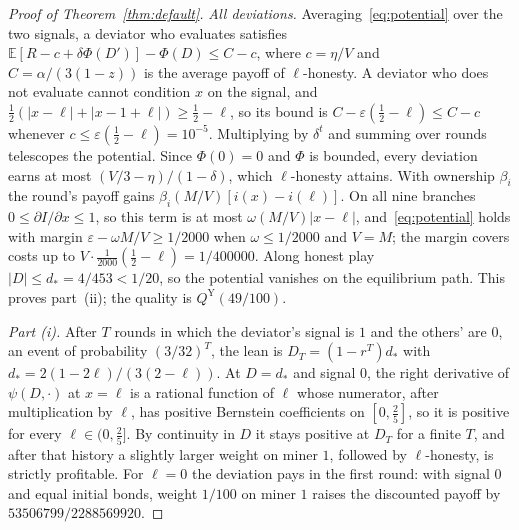\documentclass[sigconf,anonymous,review]{acmart}
\numberwithin{equation}{section}
\newcommand{\E}{\mathbb{E}}
\newcommand{\QY}{Q^{\mathrm{Y}}}
\begin{document}
\begin{proof}[Proof of Theorem~\ref{thm:default}]
\emph{All deviations.} Averaging~\eqref{eq:potential} over the two signals, a
deviator who evaluates satisfies $\E[R-c+\delta\Phi(D')]-\Phi(D)\le C-c$, where
$c=\eta/V$ and $C=\alpha/(3(1-z))$ is the average payoff of $\ell$-honesty. A
deviator who does not evaluate cannot condition $x$ on the signal, and
$\frac12(|x-\ell|+|x-1+\ell|)\ge\frac12-\ell$, so its bound is
$C-\varepsilon(\frac12-\ell)\le C-c$ whenever $c\le\varepsilon(\frac12-\ell)=10^{-5}$.
Multiplying by $\delta^t$ and summing over rounds telescopes the potential.
Since $\Phi(0)=0$ and $\Phi$ is bounded, every deviation earns at most
$(V/3-\eta)/(1-\delta)$, which $\ell$-honesty attains. With ownership
$\beta_i$ the round's payoff gains $\beta_i(M/V)[i(x)-i(\ell)]$. On all nine
branches $0\le\partial I/\partial x\le1$, so this term is at most
$\omega(M/V)|x-\ell|$, and~\eqref{eq:potential} holds with margin
$\varepsilon-\omega M/V\ge1/2000$ when $\omega\le1/2000$ and $V=M$; the margin
covers costs up to $V\cdot\frac1{2000}(\frac12-\ell)=1/400000$. Along honest play
$|D|\le d_*=4/453<1/20$, so the potential vanishes on the equilibrium path. This
proves part~(ii); the quality is $\QY(49/100)$.

\emph{Part (i).} After $T$ rounds in which the deviator's signal is $1$ and the
others' are $0$, an event of probability $(3/32)^T$, the lean is
$D_T=(1-r^T)d_*$ with $d_*=2(1-2\ell)/(3(2-\ell))$. At $D=d_*$ and signal $0$,
the right derivative of $\psi(D,\cdot)$ at $x=\ell$ is a rational function of
$\ell$ whose numerator, after multiplication by $\ell$, has positive Bernstein
coefficients on $[0,\frac25]$, so it is positive for every
$\ell\in(0,\frac25]$. By continuity in $D$ it stays positive at $D_T$ for a finite
$T$, and after that history a slightly larger weight on miner $1$, followed by
$\ell$-honesty, is strictly profitable. For $\ell=0$ the deviation pays in the
first round: with signal $0$ and equal initial bonds, weight $1/100$ on
miner $1$ raises the discounted payoff by $53506799/2288569920$.


\end{proof}
\end{document}
